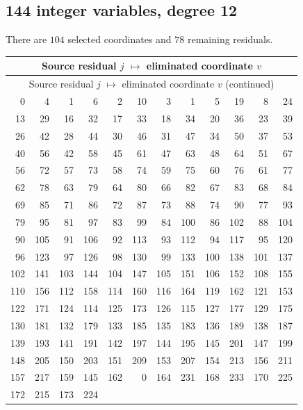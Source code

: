 \documentclass[11pt,letterpaper]{article}
\theoremstyle{definition}
\theoremstyle{remark}
\begin{document}
\subsection{144 integer variables, degree 12}
There are $104$ selected coordinates and $78$ remaining residuals.
\begingroup
\small
\setlength{\tabcolsep}{4pt}
\begin{longtable}{*{6}{r@{\,$\mapsto$\,}r}}
\hline
\multicolumn{12}{c}{Source residual $j$ $\mapsto$ eliminated coordinate $v$}\\
\hline
\endfirsthead
\hline
\multicolumn{12}{c}{Source residual $j$ $\mapsto$ eliminated coordinate $v$ (continued)}\\
\hline
\endhead
0 & 4 & 1 & 6 & 2 & 10 & 3 & 1 & 5 & 19 & 8 & 24 \\
13 & 29 & 16 & 32 & 17 & 33 & 18 & 34 & 20 & 36 & 23 & 39 \\
26 & 42 & 28 & 44 & 30 & 46 & 31 & 47 & 34 & 50 & 37 & 53 \\
40 & 56 & 42 & 58 & 45 & 61 & 47 & 63 & 48 & 64 & 51 & 67 \\
56 & 72 & 57 & 73 & 58 & 74 & 59 & 75 & 60 & 76 & 61 & 77 \\
62 & 78 & 63 & 79 & 64 & 80 & 66 & 82 & 67 & 83 & 68 & 84 \\
69 & 85 & 71 & 86 & 72 & 87 & 73 & 88 & 74 & 90 & 77 & 93 \\
79 & 95 & 81 & 97 & 83 & 99 & 84 & 100 & 86 & 102 & 88 & 104 \\
90 & 105 & 91 & 106 & 92 & 113 & 93 & 112 & 94 & 117 & 95 & 120 \\
96 & 123 & 97 & 126 & 98 & 130 & 99 & 133 & 100 & 138 & 101 & 137 \\
102 & 141 & 103 & 144 & 104 & 147 & 105 & 151 & 106 & 152 & 108 & 155 \\
110 & 156 & 112 & 158 & 114 & 160 & 116 & 164 & 119 & 162 & 121 & 153 \\
122 & 171 & 124 & 114 & 125 & 173 & 126 & 115 & 127 & 177 & 129 & 175 \\
130 & 181 & 132 & 179 & 133 & 185 & 135 & 183 & 136 & 189 & 138 & 187 \\
139 & 193 & 141 & 191 & 142 & 197 & 144 & 195 & 145 & 201 & 147 & 199 \\
148 & 205 & 150 & 203 & 151 & 209 & 153 & 207 & 154 & 213 & 156 & 211 \\
157 & 217 & 159 & 145 & 162 & 0 & 164 & 231 & 168 & 233 & 170 & 225 \\
172 & 215 & 173 & 224 & \multicolumn{2}{c}{} & \multicolumn{2}{c}{} & \multicolumn{2}{c}{} & \multicolumn{2}{c}{} \\
\hline
\end{longtable}
\endgroup
\end{document}
